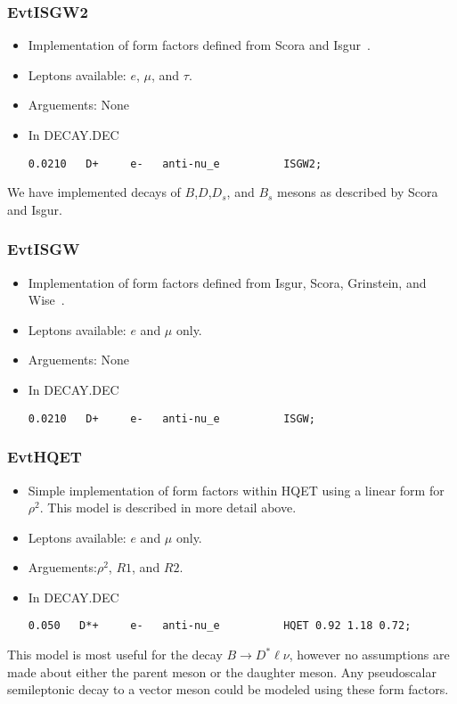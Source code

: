 \documentclass[6pt]{article}
\begin{document}
\subsubsection{EvtISGW2}
\begin{itemize}
\item Implementation of form factors defined from
Scora and Isgur~\cite{Scora95}.
\item Leptons available: $e$, $\mu$, and $\tau$.
\item Arguements: None
\item In DECAY.DEC
\begin{verbatim}
0.0210   D+     e-   anti-nu_e          ISGW2;
\end{verbatim}
\end{itemize}
\noindent We have implemented decays of $B$,$D$,$D_s$, and $B_s$
mesons as described by Scora and Isgur.


\subsubsection{EvtISGW}
\begin{itemize}
\item Implementation of form factors defined from
Isgur, Scora, Grinstein, and Wise~\cite{Isgur89a}.
\item Leptons available: $e$ and $\mu$ only.
\item Arguements: None
\item In DECAY.DEC
\begin{verbatim}
0.0210   D+     e-   anti-nu_e          ISGW;
\end{verbatim}
\end{itemize}

\subsubsection{EvtHQET}
\begin{itemize}
\item Simple implementation of form factors within
HQET using a linear form for $\rho^2$.  This model is described
in more detail above. 
\item Leptons available: $e$ and $\mu$ only.
\item Arguements:$\rho^2$, $R1$, and $R2$. 
\item In DECAY.DEC
\begin{verbatim}
0.050   D*+     e-   anti-nu_e          HQET 0.92 1.18 0.72;
\end{verbatim}
\end{itemize}
\noindent This model is most useful for the decay $B \rightarrow D^* \ell \nu$,
however no assumptions are made about either the parent meson or the
daughter meson.  Any pseudoscalar semileptonic decay to a vector meson
could be modeled using these form factors.
\end{document}
